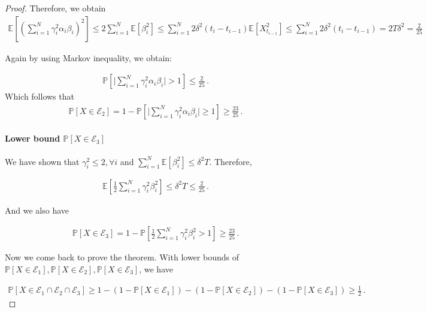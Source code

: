 \documentclass{article}
\theoremstyle{definition}
\begin{document}
\begin{proof}
Therefore, we obtain
\begin{align*}
\mathbb{E}\left[\left(\sum_{i=1}^{N} \gamma_{i}^{2}\alpha_{i}\beta_{i}\right)^{2}\right]\leq 2\sum_{i=1}^{N}\mathbb{E}\left[\beta^{2}_{i}\right]\leq \sum_{i=1}^{N}2\delta^{2}(t_{i}-t_{i-1})\mathbb{E}\left[X^{2}_{t_{i-1}}\right]\leq \sum_{i=1}^{N}2\delta^{2}(t_{i}-t_{i-1})=2T\delta^{2}=\frac{2}{25}
\end{align*}

Again by using Markov inequality, we obtain:

\begin{align*}
\mathbb{P}\left[\vert \sum_{i=1}^{N} \gamma_{i}^{2}\alpha_{i}\beta_{i}\vert > 1\right]\leq \frac{2}{25}\,.
\end{align*}
Which follows that 
\begin{align*}
\mathbb{P}\left[X\in\mathcal{E}_{2}\right]=1-\mathbb{P}\left[\vert \sum_{i=1}^{N} \gamma_{i}^{2}\alpha_{i}\beta_{i}\vert \geq 1\right]\geq \frac{23}{25}\,.
\end{align*}


\paragraph{Lower bound $\mathbb{P}[X\in\mathcal{E}_{3}]$}

We have shown that $\gamma^{2}_{i}\leq 2,\forall i$ and $\sum_{i=1}^{N}\mathbb{E}\left[\beta^{2}_{i}\right]\leq \delta^{2}T$. Therefore,

\begin{align*}
\mathbb{E}\left[\frac{1}{2}\sum_{i=1}^{N}\gamma^{2}_{i}\beta^{2}_{i}\right]\leq \delta^{2}T\leq \frac{2}{25}\,.
\end{align*}

And we also have 

\begin{align*}
\mathbb{P}\left[X\in\mathcal{E}_{3}\right]=1-\mathbb{P}\left[\frac{1}{2}\sum_{i=1}^{N}\gamma^{2}_{i}\beta^{2}_{i}>1\right]\geq \frac{23}{25}\,.
\end{align*}

Now we come back to prove the theorem. With lower bounds of $\mathbb{P}[X\in\mathcal{E}_{1}],\mathbb{P}[X\in\mathcal{E}_{2}],\mathbb{P}[X\in\mathcal{E}_{3}]$, we have

\begin{align*}
\mathbb{P}\left[X\in \mathcal{E}_{1}\cap \mathcal{E}_{2}\cap \mathcal{E}_{3}\right]\geq 1-(1-\mathbb{P}[X\in\mathcal{E}_{1}])-(1-\mathbb{P}[X\in\mathcal{E}_{2}])-(1-\mathbb{P}[X\in\mathcal{E}_{3}])\geq \frac{1}{2}\,.
\end{align*}


\end{proof}
\end{document}
